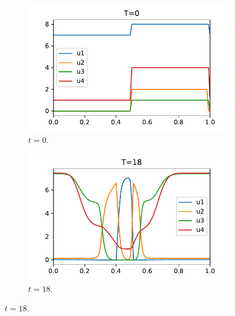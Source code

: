 \documentclass[a4paper]{article}
\numberwithin{equation}{section}
\theoremstyle{plain}
\theoremstyle{definition}
\numberwithin{theorem}{section}
\newcommand{\1}{\mathbbm{1}}
\begin{document}
\begin{figure}
    \centering
    \begin{subfigure}[b]{0.49\textwidth}
        \includegraphics[width=\textwidth]{plots/ADP_sol_00.pdf}
        \caption{$t=0$.}
        \label{fig:sol_ADP00}
    \end{subfigure}
    \begin{subfigure}[b]{0.49\textwidth}
        \includegraphics[width=\textwidth]{plots/ADP_sol_18.pdf}
        \caption{$t=18$.}
        \label{fig:sol_ADP18}
    \end{subfigure}
    

\end{figure}
\end{document}

